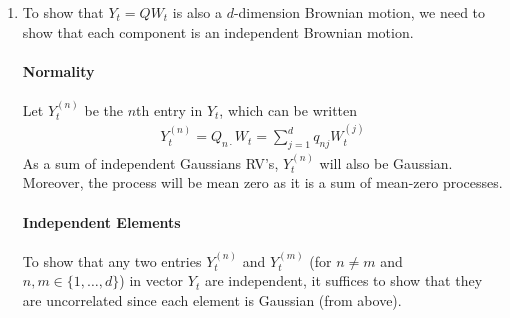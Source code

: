\documentclass[12pt]{article}
\theoremstyle{plain}
\theoremstyle{definition}
\theoremstyle{remark}
\begin{document}
\begin{enumerate}


  \item %
    To show that $Y_t = Q W_t$ is also a $d$-dimension Brownian motion,
    we need to show that each component is an independent Brownian
    motion.

    \paragraph{Normality}
    Let $Y^{(n)}_t$ be the $n$th entry in $Y_t$, which can be written
    \begin{align*}
      Y_t^{(n)} = Q_{n\cdot} W_t =
      \sum^d_{j=1} q_{nj} W^{(j)}_t
    \end{align*}
    As a sum of independent Gaussians RV's, $Y^{(n)}_t$ will also be
    Gaussian. Moreover, the process will be mean zero as it is a sum of
    mean-zero processes.

    \paragraph{Independent Elements} To show that any two entries
    $Y^{(n)}_t$ and $Y^{(m)}_t$ (for $n\neq m$ and
    $n,m\in\{1,\ldots,d\}$) in vector $Y_t$ are independent, it suffices
    to show that they are uncorrelated since each element is Gaussian
    (from above).


\end{enumerate}
\end{document}
